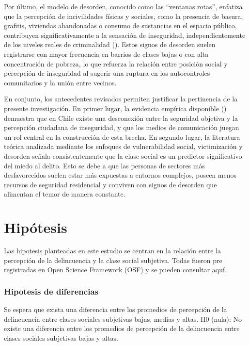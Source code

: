 \documentclass[
  spanish,
  a4paper,
  oneside]{scrbook}
\begin{document}
Por último, el modelo de desorden, conocido como las ``ventanas rotas'',
enfatiza que la percepción de incivilidades físicas y sociales, como la
presencia de basura, grafitis, viviendas abandonadas o consumo de
sustancias en el espacio público, contribuyen significativamente a la
sensación de inseguridad, independientemente de los niveles reales de
criminalidad (). Estos signos de desorden suelen registrarse con mayor frecuencia
en barrios de clases bajas o con alta concentración de pobreza, lo que
refuerza la relación entre posición social y percepción de inseguridad
al sugerir una ruptura en los autocontroles comunitarios y la unión
entre vecinos.

En conjunto, los antecedentes revisados permiten justificar la
pertinencia de la presente investigación. En primer lugar, la evidencia
empírica disponible () demuestra que en Chile existe una desconexión entre la seguridad
objetiva y la percepción ciudadana de inseguridad, y que los medios de
comunicación juegan un rol central en la construcción de esta brecha. En
segundo lugar, la literatura teórica analizada mediante los enfoques de
vulnerabilidad social, victimización y desorden señala consistentemente
que la clase social es un predictor significativo del miedo al delito.
Esto se debe a que las personas de sectores más desfavorecidos suelen
estar más expuestas a entornos complejos, poseen menos recursos de
seguridad residencial y conviven con signos de desorden que alimentan el
temor de manera constante.


\chapter{Hipótesis}\label{hipuxf3tesis}

Las hipotesis planteadas en este estudio se centran en la relación entre
la percepción de la delincuencia y la clase social subjetiva. Todas
fueron pre registradas en Open Science Framework (OSF) y se pueden
consultar \href{https://www.doi.org/10.17605/OSF.IO/9R4AN}{aquí.}

\subsection{Hipotesis de diferencias}\label{hipotesis-de-diferencias}

Se espera que exista una diferencia entre los promedios de percepción de
la delincuencia entre clases sociales subjetivas bajas, medias y altas.
H0 (nula): No existe una diferencia entre los promedios de percepción de
la delincuencia entre clases sociales subjetivas bajas y altas.
\end{document}
